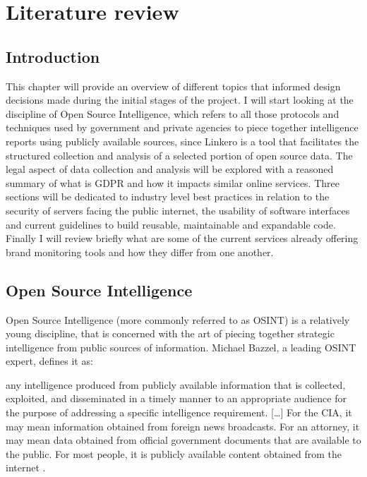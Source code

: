\chapter{Literature review}

\section{Introduction}
This chapter will provide an overview of different topics that informed design
decisions made during the initial stages of the project. I will start looking
at the discipline of Open Source Intelligence, which refers to all those
protocols and techniques used by government and private agencies to piece
together intelligence reports using publicly available sources, since Linkero is
a tool that facilitates the structured collection and analysis of a selected
portion of open source data. The legal aspect of data collection and analysis
will be explored with a reasoned summary of what is GDPR and how it impacts
similar online services. Three sections will be dedicated to industry level best
practices in relation to the security of servers facing the public internet, the
usability of software interfaces and current guidelines to build reusable,
maintainable and expandable code. Finally I will review briefly what are some of
the current services already offering brand monitoring tools and how they differ
from one another.


\section{Open Source Intelligence}
Open Source Intelligence (more commonly referred to as OSINT) is a relatively
young discipline, that is concerned with the art of piecing together strategic
intelligence from public sources of information. Michael Bazzel, a leading OSINT expert,
defines it as:
\begin{displayquote}
any intelligence produced from publicly available information that is collected,
exploited, and disseminated in a timely manner to an appropriate audience for
the purpose of addressing a specific intelligence requirement. [\ldots] For the
CIA, it may mean information obtained from foreign news broadcasts. For an
attorney, it may mean data obtained from official government documents that are available to the
public. For most people, it is publicly available content obtained from the
internet \cite{MB15}.
\end{displayquote}

